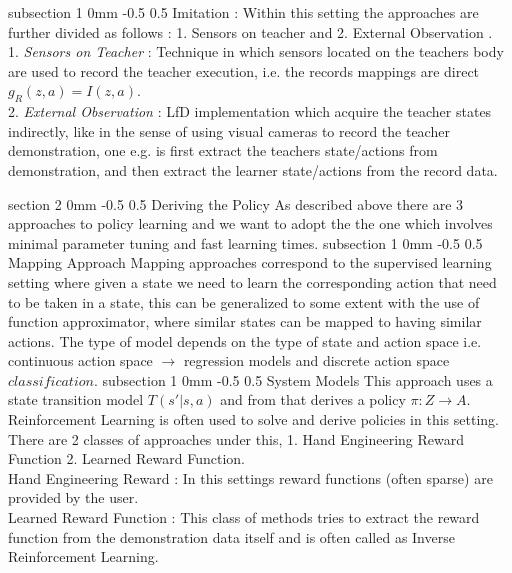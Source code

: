 \documentclass[twocolumn,11pt]{article}
\makeatletter
\renewcommand{\section}{\@startsection
{section}%
{2}%
{0mm}%
{-0.5\baselineskip}%
{0.5\baselineskip}%
{\bfseries\color{blue}}} %
\renewcommand{\subsection}{\@startsection
{subsection}%
{1}%
{0mm}%
{-0.5\baselineskip}%
{0.5\baselineskip}%
{\bfseries\color{blue}}} %
\makeatother
\begin{document}
\subsection{Imitation} : Within this setting the approaches are further  divided   as follows : 1. Sensors on teacher and 2. External Observation .\\
1. \textit{Sensors on Teacher} : Technique in which sensors located on the teachers body are used to record the teacher execution,  i.e. the records mappings are direct $g_R(z, a) = I(z,a)$.\\
2. \textit{External Observation} : LfD  implementation which acquire the teacher states indirectly,  like in the sense of using visual cameras  to record the teacher demonstration, one e.g. is first extract the teachers state/actions from demonstration,  and then extract the learner state/actions from the record data.

\section{Deriving the Policy}
As described above there are 3 approaches to policy learning and  we want to adopt the  the one which involves minimal parameter tuning and fast learning times. 
\subsection{Mapping Approach}
Mapping approaches correspond  to the supervised learning setting where given   a state  we need to learn the corresponding action that need to be taken in a state, this  can be generalized to some extent with the use of function approximator, where similar states can be mapped to having similar actions. The type of model depends on the type of state and action space i.e. continuous action space $\rightarrow$ regression models and discrete action space $classification$.
\subsection{System Models}
This approach uses a state transition model $T(s'|s,a)$ and from that derives a policy  $\pi : Z \rightarrow A$. Reinforcement Learning is often used to solve and derive policies in this setting. There are 2  classes of approaches under this, 1. Hand Engineering Reward Function 2. Learned Reward Function.\\
Hand Engineering Reward : In this settings reward functions (often sparse) are provided by the user.\\
Learned Reward Function : This class of methods tries to extract the reward function from  the  demonstration data itself and is often called as Inverse Reinforcement Learning. \\
\end{document}
